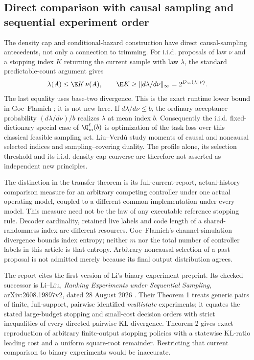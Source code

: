 \subsection*{Direct comparison with causal sampling and sequential experiment order}
The density cap and conditional-hazard construction have direct causal-sampling antecedents, not only a connection to trimming. For i.i.d. proposals of law $\nu$ and a stopping index $K$ returning the current sample with law $\lambda$, the standard predictable-count argument gives
\[
 \lambda(A)\le\E K\,\nu(A),\qquad
 \E K\ge\|d\lambda/d\nu\|_\infty
             =2^{D_\infty(\lambda\|\nu)}.
\]
The last equality uses base-two divergence. This is the exact runtime lower bound in Goc--Flamich \cite[Theorem III.1]{GocFlamich24}; it is not new here. If $d\lambda/d\nu\le b$, the ordinary acceptance probability $(d\lambda/d\nu)/b$ realizes $\lambda$ at mean index $b$. Consequently the i.i.d. fixed-dictionary special case of $\Q_m^\ell(b)$ is optimization of the task loss over this classical feasible sampling set. Liu--Verd\'u \cite{LiuVerdu18} study moments of causal and noncausal selected indices and sampling--covering duality. The profile alone, its selection threshold and its i.i.d. density-cap converse are therefore not asserted as independent new principles.

The distinction in the transfer theorem is its full-current-report, actual-history comparison measure for an arbitrary competing controller under one actual operating model, coupled to a different common implementation under every model. This measure need not be the law of any executable reference stopping rule. Decoder cardinality, retained live labels and code length of a shared-randomness index are different resources. Goc--Flamich's channel-simulation divergence bounds index entropy; neither $m$ nor the total number of controller labels in this article is that entropy. Arbitrary noncausal selection of a past proposal is not admitted merely because its final output distribution agrees.

The report cites the first version of Li's binary-experiment preprint. Its checked successor is Li--Liu, \emph{Ranking Experiments under Sequential Sampling}, arXiv:2608.19897v2, dated 28 August 2026 \cite{LiLiu26}. Their Theorem 1 treats generic pairs of finite, full-support, pairwise identified \emph{multistate} experiments; it equates the stated large-budget stopping and small-cost decision orders with strict inequalities of every directed pairwise KL divergence. Theorem 2 gives exact reproduction of arbitrary finite-output stopping policies with a statewise KL-ratio leading cost and a uniform square-root remainder. Restricting that current comparison to binary experiments would be inaccurate.

